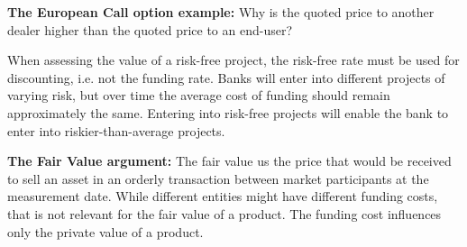 \documentclass[10pt,a4paper]{article}
\begin{document}
            \textbf{The European Call option example:} Why is the quoted price to another dealer higher than the quoted price to an end-user?
            
            When assessing the value of a risk-free project, the risk-free rate must be used for discounting, i.e. not the funding rate. Banks will enter into different projects of varying risk, but over time the average cost of funding should remain approximately the same. Entering into risk-free projects will enable the bank to enter into riskier-than-average projects.
            
            \textbf{The Fair Value argument:} The fair value us the price that would be received to sell an asset in an orderly transaction between market participants at the measurement date. While different entities might have different funding costs, that is not relevant for the fair value of a product. The funding cost influences only the private value of a product.
\end{document}
